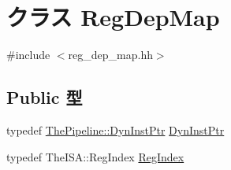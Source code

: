 \hypertarget{classRegDepMap}{
\section{クラス RegDepMap}
\label{classRegDepMap}
}


{\ttfamily \#include $<$reg\_\-dep\_\-map.hh$>$}\subsection*{Public 型}
\begin{DoxyCompactItemize}
\item 
typedef \hyperlink{classRefCountingPtr}{ThePipeline::DynInstPtr} \hyperlink{classRegDepMap_af9d0c8a46736ba6aa2d8bb94da1a5e73}{DynInstPtr}
\item 
typedef TheISA::RegIndex \hyperlink{classRegDepMap_a36d25e03e43fa3bb4c5482cbefe5e0fb}{RegIndex}
\end{DoxyCompactItemize}
